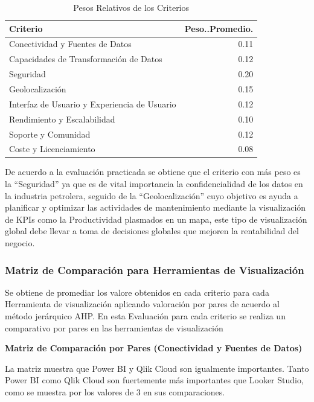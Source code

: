 \documentclass[
  11pt,
  bookmarksnumbered]{article}
\begin{document}
\begin{table}[H]

\caption{\label{tab:unnamed-chunk-29}Pesos Relativos de los Criterios}
\centering
\fontsize{12}{14}\selectfont
\begin{tabular}[t]{l|r}
\hline
Criterio & Peso..Promedio.\\
\hline
Conectividad y Fuentes de Datos & 0.11\\
\hline
Capacidades de Transformación de Datos & 0.12\\
\hline
Seguridad & 0.20\\
\hline
Geolocalización & 0.15\\
\hline
Interfaz de Usuario y Experiencia de Usuario & 0.12\\
\hline
Rendimiento y Escalabilidad & 0.10\\
\hline
Soporte y Comunidad & 0.12\\
\hline
Coste y Licenciamiento & 0.08\\
\hline
\end{tabular}
\end{table}

De acuerdo a la evaluación practicada se obtiene que el criterio con más peso es la ``Seguridad'' ya que es de vital importancia la confidencialidad de los datos en la industria petrolera, seguido de la ``Geolocalización'' cuyo objetivo es ayuda a planificar y optimizar las actividades de mantenimiento mediante la visualización de KPIs como la Productividad plasmados en un mapa, este tipo de visualización global debe llevar a toma de decisiones globales que mejoren la rentabilidad del negocio.

\hypertarget{matriz-de-comparaciuxf3n-para-herramientas-de-visualizaciuxf3n}{%
\subsubsection{Matriz de Comparación para Herramientas de Visualización}\label{matriz-de-comparaciuxf3n-para-herramientas-de-visualizaciuxf3n}}

Se obtiene de promediar los valore obtenidos en cada criterio para cada Herramienta de visualización aplicando valoración por pares de acuerdo al método jerárquico AHP.
En esta Evaluación para cada criterio se realiza un comparativo por pares en las herramientas de visualización

\textbf{Matriz de Comparación por Pares (Conectividad y Fuentes de Datos)}

La matriz muestra que Power BI y Qlik Cloud son igualmente importantes. Tanto Power BI como Qlik Cloud son fuertemente más importantes que Looker Studio, como se muestra por los valores de 3 en sus comparaciones.
\end{document}
